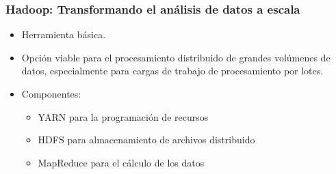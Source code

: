 \documentclass[
10pt, %
aspectratio=169, %
]{beamer}
\begin{document}
	\begin{frame}
		
		\frametitle{Hadoop: Transformando el análisis de datos a escala}
		
		\begin{itemize}
			
			\item Herramienta básica. \\[3mm]
			 
			\item Opción viable para el procesamiento distribuido de grandes volúmenes de datos, especialmente para cargas de trabajo de procesamiento por lotes. \\[3mm]
			
			\item Componentes:
			\begin{itemize}
				\item YARN para la programación de recursos
				\item HDFS para almacenamiento de archivos distribuido
				\item MapReduce para el cálculo de los datos
				
			\end{itemize}
			
		\end{itemize}
		
	\end{frame}
	
\end{document}
